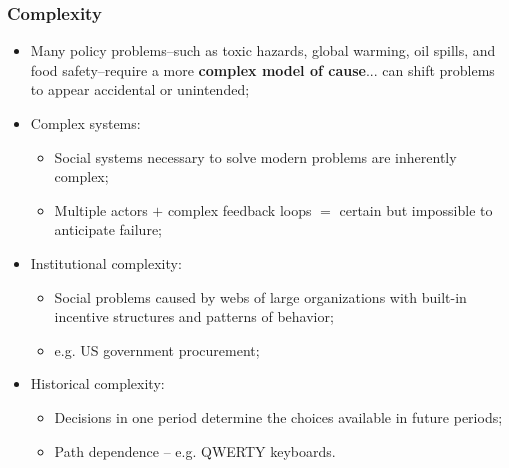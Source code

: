 \documentclass[aspectratio=169]{beamer}
\theoremstyle{principle}
\begin{document}
\begin{frame}
\frametitle{Complexity}
\begin{itemize}
\item Many policy problems--such as toxic hazards, global warming, oil spills, and food safety--require a more \textbf{complex model of cause}... can shift problems to appear accidental or unintended;
\bigskip
\item Complex systems:
\begin{itemize}
\item Social systems necessary to solve modern problems are inherently complex;
\item Multiple actors $+$ complex feedback loops $=$ certain but impossible to anticipate failure;
\end{itemize}
\bigskip
\item Institutional complexity:
\begin{itemize}
\item Social problems caused by webs of large organizations with built-in incentive structures and patterns of behavior;
\item e.g. US government procurement;
\end{itemize}
\bigskip
\item Historical complexity:
\begin{itemize}
\item Decisions in one period determine the choices available in future periods;
\item Path dependence -- e.g. QWERTY keyboards.
\end{itemize}
\end{itemize}
\end{frame}

\end{document}
